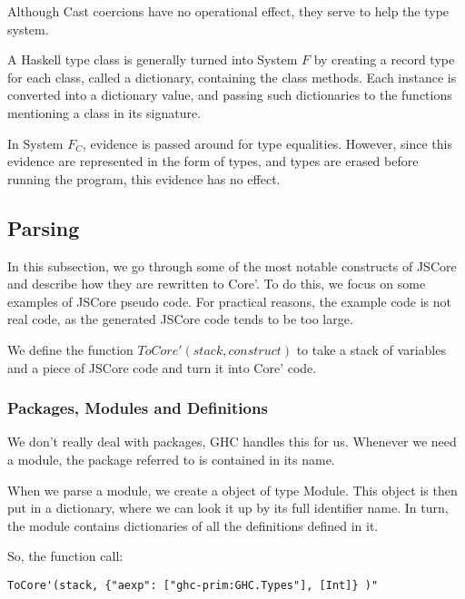 Although Cast coercions have no operational effect, they serve to help the
type system.


A Haskell type class is generally turned into System $F$ by creating a 
record type for each class, called a dictionary, containing the class methods.
Each instance is converted into a dictionary value, and passing such 
dictionaries to the functions mentioning a class in its signature. 
\cite{sulzmann2007system}


In System $F_C$, evidence is passed around for type equalities. However,
since this evidence are represented in the form of types, and types are
erased before running the program, this evidence has no effect.
\cite{sulzmann2007system}

\subsection{Parsing}

In this subsection, we go through some of the most notable constructs of JSCore and
describe how they are rewritten to Core'. To do this, we focus on some examples of
JSCore pseudo code. For practical reasons, the example code is not real code, as the
generated JSCore code tends to be too large.

We define the function $ToCore'(stack, construct)$ to take a stack of variables and 
a piece of JSCore code and turn it into Core' code.


\subsubsection*{Packages, Modules and Definitions}

We don't really deal with packages, GHC handles this for us. Whenever we
need a module, the package referred to is contained in its name.

When we parse a module, we create a object of type Module. This object is
then put in a dictionary, where we can look it up by its full identifier name.
In turn, the module contains dictionaries of all the definitions defined in it.

So, the function call:
\lstset{ %
language=Haskell,
label=lst:int1
}
\begin{lstlisting}
ToCore'(stack, {"aexp": ["ghc-prim:GHC.Types"], [Int]} )" 
\end{lstlisting}

